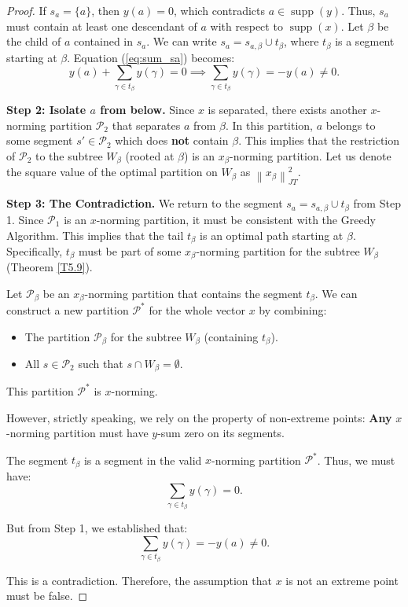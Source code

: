 \documentclass[10pt,a4paper]{amsart}
\newcommand{\JT}{JT}
\newcommand{\norm}[1]{\left\lVert#1\right\rVert}
\newcommand{\supp}{\operatorname{supp}}
\begin{document}
\begin{proof}
    If $s_a = \{a\}$, then $y(a) = 0$, which contradicts $a \in \supp(y)$. Thus, $s_a$ must contain at least one descendant of $a$ with respect to $\supp(x)$. Let $\beta$ be the child of $a$ contained in $s_a$. We can write $s_a = s_{a, \beta} \cup t_\beta$, where $t_\beta$ is a segment starting at $\beta$.
    Equation (\ref{eq:sum_sa}) becomes:
    \[ y(a) + \sum_{\gamma \in t_\beta} y(\gamma) = 0 \implies \sum_{\gamma \in t_\beta} y(\gamma) = -y(a) \neq 0. \]
    
        
    \textbf{Step 2: Isolate $a$ from below.}
    Since $x$ is separated, there exists another $x$-norming partition $\mathcal{P}_2$ that separates $a$ from $\beta$.
    In this partition, $a$ belongs to some segment $s' \in \mathcal{P}_2$ which does \textbf{not} contain $\beta$.
    This implies that the restriction of $\mathcal{P}_2$ to the subtree $W_\beta$ (rooted at $\beta$) is an $x_\beta$-norming partition. Let us denote the square value of the optimal partition on $W_\beta$ as $\norm{x_\beta}_{\JT}^2$.
    
    \textbf{Step 3: The Contradiction.}
    We return to the segment $s_a = s_{a, \beta} \cup t_\beta$ from Step 1.
    Since $\mathcal{P}_1$ is an $x$-norming partition, it must be consistent with the Greedy Algorithm. This implies that the tail $t_\beta$ is an optimal path starting at $\beta$. Specifically, $t_\beta$ must be part of some $x_\beta$-norming partition for the subtree $W_\beta$ (Theorem \ref{T5.9}).
    
    Let $\mathcal{P}_\beta$ be an $x_\beta$-norming partition that contains the segment $t_\beta$. We can construct a new partition $\mathcal{P}^*$ for the whole vector $x$ by combining:
    \begin{itemize}
        \item The partition $\mathcal{P}_\beta$ for the subtree $W_\beta$ (containing $t_\beta$).
        \item All $s \in \mathcal{P}_2$ such that $s \cap W_\beta = \emptyset$.
    \end{itemize}
    This partition $\mathcal{P}^*$ is $x$-norming.
    
    However, strictly speaking, we rely on the property of non-extreme points: \textbf{Any} $x$-norming partition must have $y$-sum zero on its segments.
    
    The segment $t_\beta$ is a segment in the valid $x$-norming partition $\mathcal{P}^*$.
    Thus, we must have:
    \[ \sum_{\gamma \in t_\beta} y(\gamma) = 0. \]
    
    But from Step 1, we established that:
    \[ \sum_{\gamma \in t_\beta} y(\gamma) = -y(a) \neq 0. \]
    
    This is a contradiction. Therefore, the assumption that $x$ is not an extreme point must be false.
\end{proof}
\end{document}
